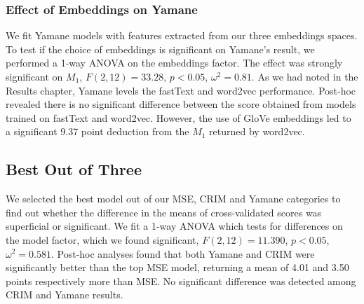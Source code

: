 \subsubsection{Effect of Embeddings on Yamane}
We fit Yamane models with features extracted from our three embeddings spaces.  To test if the choice of embeddings is significant on Yamane's result, we performed a 1-way \ac{ANOVA} on the embeddings factor.  The effect was strongly significant on $M_1$, $F(2,12)=33.28$, $p < 0.05$, $\omega^2=0.81$.  As we had noted in the Results chapter, Yamane levels the fastText and word2vec performance.  Post-hoc revealed there is no significant difference between the score obtained from models trained on fastText and word2vec.  However, the use of GloVe embeddings led to a significant 9.37 point deduction from the $M_1$ returned by word2vec.

\subsection{Best Out of Three}
We selected the best model out of our \ac{MSE}, CRIM and Yamane categories to find out whether the difference in the means of cross-validated scores was superficial or significant.  We fit a 1-way \ac{ANOVA} which tests for differences on the model factor, which we found significant, $F(2,12)=11.390$, $p < 0.05$, $\omega^2=0.581$.  Post-hoc analyses found that both Yamane and CRIM were significantly better than the top \ac{MSE} model, returning a mean of 4.01 and 3.50 points respectively more than \ac{MSE}.  No significant difference was detected among CRIM and Yamane results.

